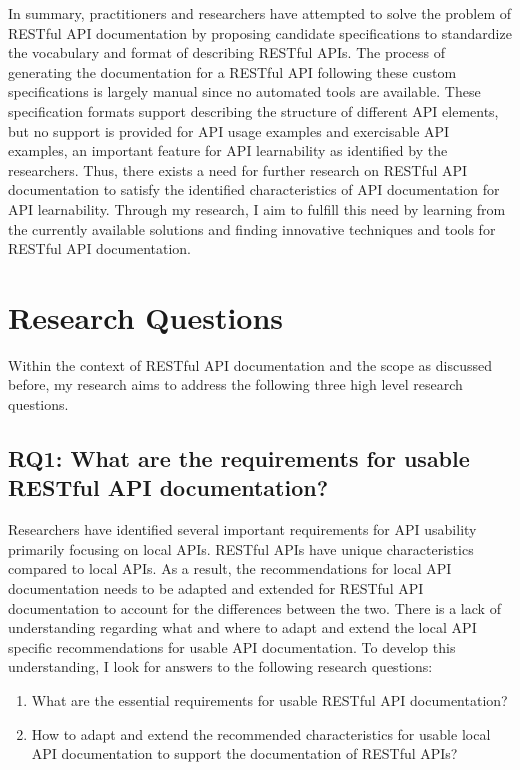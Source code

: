 \documentclass[11pt,oneside]{book}
\begin{document}
In summary, practitioners and researchers have attempted to solve the problem of RESTful API documentation by proposing candidate specifications to standardize the vocabulary and format of describing RESTful APIs. The process of generating the documentation for a RESTful API following these custom specifications is largely manual since no automated tools are available. These specification formats support describing the structure of different API elements, but no support is provided for API usage examples and exercisable API examples, an important feature for API learnability as identified by the researchers. Thus, there exists a need for further research on RESTful API documentation to satisfy the identified characteristics of API documentation for API learnability. Through my research, I aim to fulfill this need by learning from the currently available solutions and finding innovative techniques and tools for RESTful API documentation.


\section{Research Questions}

Within the context of RESTful API documentation and the scope as discussed before, my research aims to address the following three high level research questions.

\subsection{RQ1: What are the requirements for usable RESTful API documentation?
}

Researchers have identified several important requirements for API usability primarily focusing on local APIs. RESTful APIs have unique characteristics compared to local APIs. As a result, the recommendations for local API documentation needs to be adapted and extended for RESTful API documentation to account for the differences between the two. There is a lack of understanding regarding what and where to adapt and extend the local API specific recommendations for usable API documentation. To develop this understanding, I look for answers to the following research questions:

\begin{enumerate}
  \item What are the essential requirements for usable RESTful API documentation?
  \item How to adapt and extend the recommended characteristics for usable local API documentation to support the documentation of RESTful APIs?
\end{enumerate}
\end{document}

